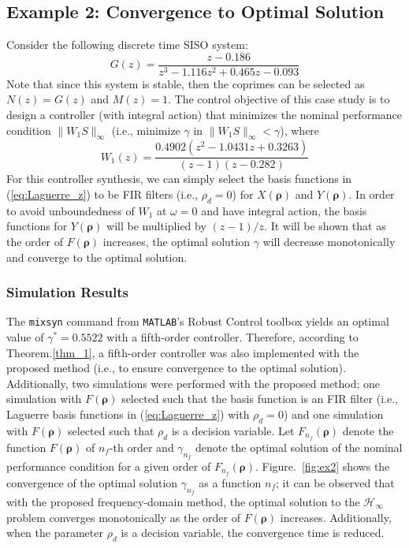 \documentclass[letterpaper, 10 pt, conference]{ieeeconf}  %
\begin{document}
\subsection{Example 2: Convergence to Optimal Solution}
Consider the following discrete time SISO system:
\begin{equation}
G(z) = \frac{z-0.186}{z^3 - 1.116z^2 + 0.465z-0.093}
\end{equation}
Note that since this system is stable, then the coprimes can be selected as $N(z) = G(z)$ and $M(z) = 1$. The control objective of this case study is to design a controller (with integral action) that minimizes the nominal performance condition $\|W_1S \|_{\infty}$ (i.e., minimize $\gamma$ in $\|W_1S \|_{\infty} < \gamma$), where
\begin{equation}
W_1(z) = \frac{0.4902(z^2-1.0431z+0.3263)}{(z-1)(z-0.282)}
\end{equation}
For this controller synthesis, we can simply select the basis functions in (\ref{eq:Laguerre_z}) to be FIR filters (i.e., $\rho_d = 0$) for $X(\bm{\rho})$ and $Y(\bm{\rho})$. In order to avoid unboundedness of $W_1$ at $\omega = 0$ and have integral action, the basis functions for $Y(\bm{\rho})$ will be multiplied by $(z-1)/z$. It will be shown that as the order of $F(\bm{\rho})$ increases, the optimal solution $\gamma$ will decrease monotonically and converge to the optimal solution. 

\subsubsection{Simulation Results}
The \texttt{mixsyn} command from \texttt{MATLAB}'s Robust Control toolbox yields an optimal value of $\gamma^* = 0.5522$ with a fifth-order controller. Therefore, according to Theorem.\ref{thm_1}, a fifth-order controller was also implemented with the proposed method (i.e., to ensure convergence to the optimal solution). Additionally, two simulations were performed with the proposed method; one simulation with $F(\bm{\rho})$ selected such that the basis function is an FIR filter (i.e., Laguerre basis functions in (\ref{eq:Laguerre_z}) with $\rho_d = 0$) and one simulation with $F(\bm{\rho})$ selected such that $\rho_d$ is a decision variable.  Let $F_{n_f}(\bm{\rho})$ denote the function $F(\bm{\rho})$ of $n_f$-th order and $\gamma_{n_f}$ denote the optimal solution of the nominal performance condition for a given order of $F_{n_f}(\bm{\rho})$. Figure.~\ref{fig:ex2} shows the convergence of the optimal solution $\gamma_{n_f}$ as a function $n_f$; it can be observed that with the proposed frequency-domain method, the optimal solution to the $\mathcal{H}_{\infty}$ problem converges monotonically as the order of $F(\bm{\rho})$ increases. Additionally, when the parameter $\rho_d$ is a decision variable, the convergence time is reduced. 
\end{document}
